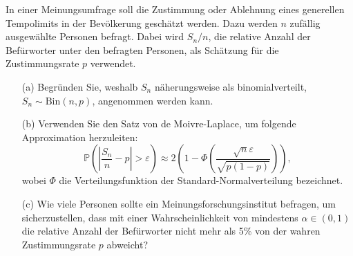 \begin{Problem}
	In einer Meinungsumfrage soll die Zustimmung oder Ablehnung eines generellen Tempolimits in der Bevölkerung geschätzt werden. Dazu werden \( n \) zufällig ausgewählte Personen befragt. Dabei wird \( S_n/n \), die relative Anzahl der Befürworter unter den befragten Personen, als Schätzung für die Zustimmungsrate \( p \) verwendet.
	
	\begin{enumerate}
		\item[(a)] Begründen Sie, weshalb \( S_n \) näherungsweise als binomialverteilt, \( S_n \sim \text{Bin}(n,p) \), angenommen werden kann.
		
		\item[(b)] Verwenden Sie den Satz von de Moivre-Laplace, um folgende Approximation herzuleiten:
		\[
		\mathbb{P} \left( \left| \frac{S_n}{n} - p \right| > \varepsilon \right) \approx 2 \left( 1 - \Phi \left( \frac{\sqrt{n} \varepsilon}{\sqrt{p(1 - p)}} \right) \right),
		\]
		wobei \( \Phi \) die Verteilungsfunktion der Standard-Normalverteilung bezeichnet.
		
		\item[(c)] Wie viele Personen sollte ein Meinungsforschungsinstitut befragen, um sicherzustellen, dass mit einer Wahrscheinlichkeit von mindestens \( \alpha \in (0,1) \) die relative Anzahl der Befürworter nicht mehr als 5\% von der wahren Zustimmungsrate \( p \) abweicht?
	\end{enumerate}
\end{Problem}
